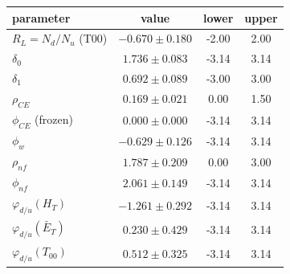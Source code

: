 \begin{tabular}{lccc}
\toprule
parameter & value & lower & upper \\
\midrule
$R_L=N_d/N_u$ (T00) & $-0.670 \pm 0.180$ & -2.00 & 2.00 \\
$\delta_0$ & $1.736 \pm 0.083$ & -3.14 & 3.14 \\
$\delta_1$ & $0.692 \pm 0.089$ & -3.00 & 3.00 \\
$\rho_{CE}$ & $0.169 \pm 0.021$ & 0.00 & 1.50 \\
$\phi_{CE}$ (frozen) & $0.000 \pm 0.000$ & -3.14 & 3.14 \\
$\phi_w$ & $-0.629 \pm 0.126$ & -3.14 & 3.14 \\
$\rho_{nf}$ & $1.787 \pm 0.209$ & 0.00 & 3.00 \\
$\phi_{nf}$ & $2.061 \pm 0.149$ & -3.14 & 3.14 \\
$\varphi_{d/u}(H_T)$ & $-1.261 \pm 0.292$ & -3.14 & 3.14 \\
$\varphi_{d/u}(\bar E_T)$ & $0.230 \pm 0.429$ & -3.14 & 3.14 \\
$\varphi_{d/u}(T_{00})$ & $0.512 \pm 0.325$ & -3.14 & 3.14 \\
\bottomrule
\end{tabular}
